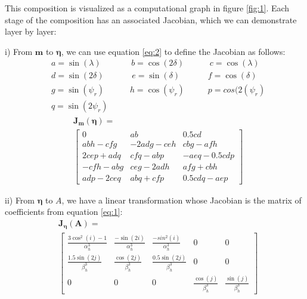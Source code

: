 \documentclass[preprint]{seismica}
\begin{document}
    \noindent This composition is visualized as a computational graph in figure \ref{fig:1}.
    Each stage of the composition has an associated Jacobian, which we can demonstrate layer by layer:
    
    i) From $\bm{m}$ to $\bm{\eta}$, we can use equation \ref{eq:2} to define the Jacobian
    as follows:
    \begin{align*}
      &a = \sin(\lambda)\;\;\;\;\;\;\;\;\;\;\;\;\; b = \cos(2\delta)\;\;\;\;\;\;\;\;\;\;\; c = \cos(\lambda)\\
      &d = \sin(2\delta)\;\;\;\;\;\;\;\;\;\;\;\; e = \sin(\delta)\;\;\;\;\;\;\;\;\;\;\;\; f = \cos(\delta)\\
      &g = \sin(\psi_r)\;\;\;\;\;\;\;\;\;\;\; h = \cos(\psi_r)\;\;\;\;\;\;\;\;\;\; p = cos(2(\psi_r)\\
      &q = \sin(2\psi_r)
    \end{align*}
    \begin{align} \label{eq:18}
      \nonumber&\bm{J_m}(\bm{\eta}) = \\
      &\begin{bmatrix}
        0         &ab         &0.5cd\\
        abh-cfg   &-2adg-ceh  &cbg-afh\\
        2cep+adq  &cfq-abp    &-aeq-0.5cdp\\
        -cfh-abg  &ceg-2adh   &afg+cbh\\
        adp-2ceq  &abq+cfp    &0.5cdq-aep
      \end{bmatrix}
    \end{align}

    ii) From $\bm{\eta}$ to $A$, we have a linear transformation whose Jacobian is the matrix
    of coefficients from equation \ref{eq:1}:
    \begin{align} \label{eq:19}
      \nonumber&\bm{J_\eta}(\bm{A}) = \\
      &\begin{bmatrix}
        \frac{3\cos^2(i)-1}{\alpha_h^3}    &\frac{-\sin(2i)}{\alpha_h^3}    &\frac{-sin^2(i)}{\alpha_h^3}   &0    &0\\
        \frac{1.5\sin(2j)}{\beta_h^3}      &\frac{\cos(2j)}{\beta_h^3}      &\frac{0.5\sin(2j)}{\beta_h^3}  &0    &0\\
        0         &0           &0        &\frac{\cos(j)}{\beta_h^3}       &\frac{\sin(j)}{\beta_h^3}
      \end{bmatrix}
    \end{align}
\end{document}
